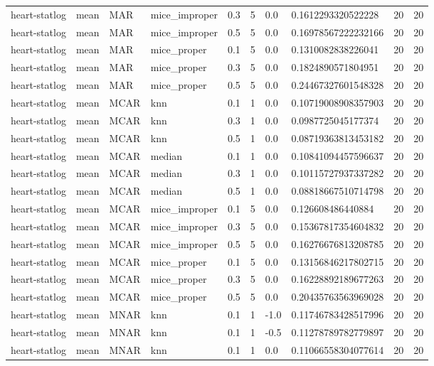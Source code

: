 \begin{tabular}{llllllllll}
heart-statlog & mean & MAR & mice\_improper & 0.3 & 5 & 0.0 & 0.1612293320522228 & 20 & 20 \\
heart-statlog & mean & MAR & mice\_improper & 0.5 & 5 & 0.0 & 0.16978567222232166 & 20 & 20 \\
heart-statlog & mean & MAR & mice\_proper & 0.1 & 5 & 0.0 & 0.1310082838226041 & 20 & 20 \\
heart-statlog & mean & MAR & mice\_proper & 0.3 & 5 & 0.0 & 0.1824890571804951 & 20 & 20 \\
heart-statlog & mean & MAR & mice\_proper & 0.5 & 5 & 0.0 & 0.24467327601548328 & 20 & 20 \\
heart-statlog & mean & MCAR & knn & 0.1 & 1 & 0.0 & 0.10719008908357903 & 20 & 20 \\
heart-statlog & mean & MCAR & knn & 0.3 & 1 & 0.0 & 0.0987725045177374 & 20 & 20 \\
heart-statlog & mean & MCAR & knn & 0.5 & 1 & 0.0 & 0.08719363813453182 & 20 & 20 \\
heart-statlog & mean & MCAR & median & 0.1 & 1 & 0.0 & 0.10841094457596637 & 20 & 20 \\
heart-statlog & mean & MCAR & median & 0.3 & 1 & 0.0 & 0.10115727937337282 & 20 & 20 \\
heart-statlog & mean & MCAR & median & 0.5 & 1 & 0.0 & 0.08818667510714798 & 20 & 20 \\
heart-statlog & mean & MCAR & mice\_improper & 0.1 & 5 & 0.0 & 0.126608486440884 & 20 & 20 \\
heart-statlog & mean & MCAR & mice\_improper & 0.3 & 5 & 0.0 & 0.15367817354604832 & 20 & 20 \\
heart-statlog & mean & MCAR & mice\_improper & 0.5 & 5 & 0.0 & 0.16276676813208785 & 20 & 20 \\
heart-statlog & mean & MCAR & mice\_proper & 0.1 & 5 & 0.0 & 0.13156846217802715 & 20 & 20 \\
heart-statlog & mean & MCAR & mice\_proper & 0.3 & 5 & 0.0 & 0.16228892189677263 & 20 & 20 \\
heart-statlog & mean & MCAR & mice\_proper & 0.5 & 5 & 0.0 & 0.20435763563969028 & 20 & 20 \\
heart-statlog & mean & MNAR & knn & 0.1 & 1 & -1.0 & 0.11746783428517996 & 20 & 20 \\
heart-statlog & mean & MNAR & knn & 0.1 & 1 & -0.5 & 0.11278789782779897 & 20 & 20 \\
heart-statlog & mean & MNAR & knn & 0.1 & 1 & 0.0 & 0.11066558304077614 & 20 & 20 \\

\end{tabular}
